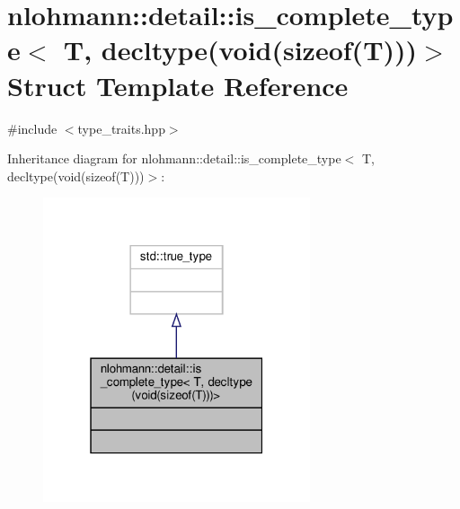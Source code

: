 \hypertarget{structnlohmann_1_1detail_1_1is__complete__type_3_01_t_00_01decltype_07void_07sizeof_07_t_08_08_08_4}{}\section{nlohmann\+:\+:detail\+:\+:is\+\_\+complete\+\_\+type$<$ T, decltype(void(sizeof(T)))$>$ Struct Template Reference}
\label{structnlohmann_1_1detail_1_1is__complete__type_3_01_t_00_01decltype_07void_07sizeof_07_t_08_08_08_4}


{\ttfamily \#include $<$type\+\_\+traits.\+hpp$>$}



Inheritance diagram for nlohmann\+:\+:detail\+:\+:is\+\_\+complete\+\_\+type$<$ T, decltype(void(sizeof(T)))$>$\+:\nopagebreak
\begin{figure}[H]
\begin{center}
\leavevmode
\includegraphics[width=223pt]{structnlohmann_1_1detail_1_1is__complete__type_3_01_t_00_01decltype_07void_07sizeof_07_t_08_08_08_4__inherit__graph}
\end{center}
\end{figure}


